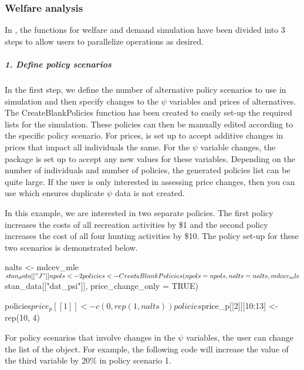 \hypertarget{welfare-analysis}{%
\subsubsection{Welfare analysis}\label{welfare-analysis}}

In , the functions for welfare and demand simulation have
been divided into 3 steps to allow users to parallelize operations as
desired.

\hypertarget{define-policy-scenarios}{%
\subparagraph{1. Define policy
scenarios}\label{define-policy-scenarios}}

In the first step, we define the number of alternative policy scenarios
to use in simulation and then specify changes to the \(\psi\) variables
and prices of alternatives. The CreateBlankPolicies function has been
created to easily set-up the required lists for the simulation. These
policies can then be manually edited according to the specific policy
scenario. For prices,  is set up to accept additive changes
in prices that impact all individuals the same. For the \(\psi\)
variable changes, the package is set up to accept any new values for
these variables. Depending on the number of individuals and number of
policies, the generated policies list can be quite large. If the user is
only interested in assessing price changes, then you can use
 which ensures duplicate \(\psi\) data
is not created.

In this example, we are interested in two separate policies. The first
policy increases the costs of all recreation activities by \$1 and the
second policy increases the cost of all four hunting activities by \$10.
The policy set-up for these two scenarios is demonstrated below.

\begin{Schunk}
\begin{Sinput}
nalts <- mdcev_mle$stan_data[["J"]]
npols <- 2

policies<-  CreateBlankPolicies(npols = npols,
                                nalts = nalts,
                                mdcev_mle$stan_data[["dat_psi"]],
                                price_change_only = TRUE)

policies$price_p[[1]] <- c(0, rep(1, nalts))
policies$price_p[[2]][10:13] <- rep(10, 4)
\end{Sinput}
\end{Schunk}

For policy scenarios that involve changes in the \(\psi\) variables, the
user can change the  list of the  object.
For example, the following code will increase the value of the third
variable by 20\% in policy scenario 1.

